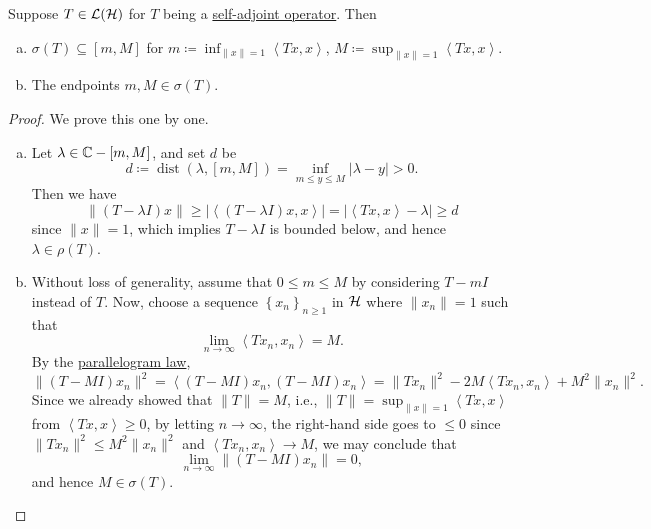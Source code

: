 \begin{theorem}\label{thm:spectrum-interval}
	Suppose \(T \in \mathcal{\MakeUppercase{l}} (\mathcal{\MakeUppercase{h}} )\) for \(T\) being a \hyperref[def:self-adjoint-op]{self-adjoint operator}. Then
	\begin{enumerate}[(a)]
		\item \(\sigma (T) \subseteq [m, M]\) for \(m\coloneqq \inf _{\lVert x \rVert = 1}\left\langle Tx, x \right\rangle \), \(M\coloneqq \sup _{\lVert x \rVert = 1} \left\langle Tx, x \right\rangle \).
		\item The endpoints \(m, M\in \sigma (T)\).
	\end{enumerate}
\end{theorem}
\begin{proof}
	We prove this one by one.
	\begin{enumerate}[(a)]
		\item Let \(\lambda \in \mathbb{\MakeUppercase{c}} -[m, M]\), and set \(d\) be
		      \[
			      d\coloneqq \mathop{\mathrm{dist}}(\lambda , [m, M])
			      = \inf _{m \leq y\leq M} \vert \lambda -y \vert > 0.
		      \]
		      Then we have
		      \[
			      \lVert (T-\lambda I)x \rVert
			      \geq \vert \left\langle (T-\lambda I)x, x \right\rangle  \vert
			      = \vert \left\langle Tx, x \right\rangle - \lambda  \vert
			      \geq d
		      \]
		      since \(\lVert x \rVert = 1\), which implies \(T - \lambda I\) is bounded below, and hence \(\lambda \in \rho (T)\).
		\item Without loss of generality, assume that \(0 \leq m \leq M\) by considering \(T - mI\) instead of \(T\). Now, choose a sequence \(\left\{ x_n \right\} _{n\geq 1}\) in \(\mathcal{\MakeUppercase{h}} \) where \(\lVert x_n \rVert = 1\) such that
		      \[
			      \lim_{n \to \infty} \left\langle Tx_n, x_n \right\rangle = M.
		      \]
		      By the \hyperref[lma:parallelogram-law]{parallelogram law},
		      \[
			      \lVert (T-MI)x_n \rVert ^{2}
			      = \left\langle (T-MI)x_n, (T-MI)x_n \right\rangle
			      = \lVert Tx_n \rVert ^2 - 2M\left\langle Tx_n, x_n \right\rangle + M^{2} \lVert x_n \rVert ^{2}.
		      \]
		      Since we already showed that \(\lVert T \rVert = M\), i.e., \(\lVert T \rVert = \sup _{\lVert x \rVert = 1}\left\langle Tx, x \right\rangle \) from \(\left\langle Tx, x \right\rangle \geq 0\), by letting \(n \to \infty \), the right-hand side goes to \(\leq 0\) since \(\lVert Tx_n \rVert ^{2} \leq M^{2} \lVert x_n \rVert ^{2} \) and \(\left\langle Tx_n, x_n \right\rangle \to M\), we may conclude that
		      \[
			      \lim_{n \to \infty} \lVert (T-MI)x_n \rVert = 0,
		      \]
		      and hence \(M\in \sigma (T)\).
	\end{enumerate}
\end{proof}

